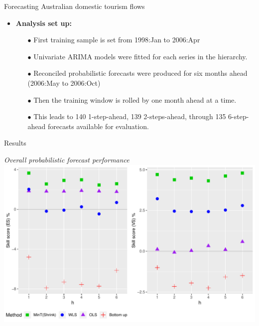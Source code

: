 \documentclass[11pt,xcolor=dvipsnames,handout]{beamer}
\begin{document}
\begin{frame}{Forecasting Australian domestic tourism flows}
\begin{itemize}[<+-| alert@+>]
	\item \textbf{Analysis set up:}
\begin{itemize}[<+-| alert@+>]
	\item[$\bullet$] First training sample is set from 1998:Jan to 2006:Apr 
	\item[$\bullet$] Univariate ARIMA models were fitted for each series in the hierarchy.
	\item[$\bullet$] Reconciled probabilistic forecasts were produced for six months ahead (2006:May to 2006:Oct)
	\item[$\bullet$] Then the training window is rolled by one month ahead at a time.
	\item[$\bullet$] This leads to 140 1-step-ahead, 139 2-steps-ahead, through 135 6-step-ahead forecasts available for evaluation. 
\end{itemize}
\end{itemize}
\end{frame}




\begin{frame}{Results}

	\textit{Overall probabilistic forecast performance}
	\space
	\centering
	\includegraphics[scale=0.5]{Figures/Results/Overall-MultivS}
	

\end{frame}

\end{document}
